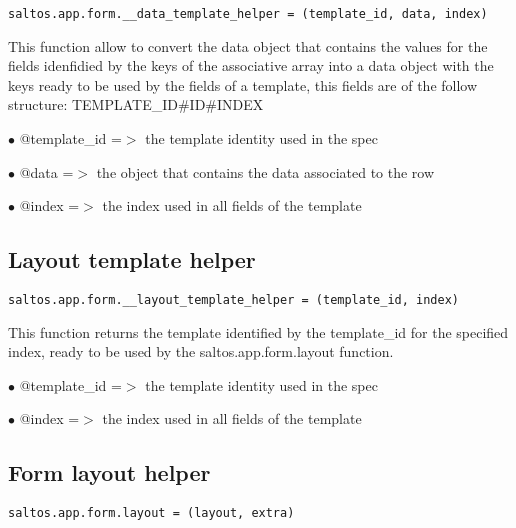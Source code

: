 \documentclass[a4paper]{book}
\begin{document}
\begin{lstlisting}
saltos.app.form.__data_template_helper = (template_id, data, index)
\end{lstlisting}

This function allow to convert the data object that contains the values for the fields idenfidied
by the keys of the associative array into a data object with the keys ready to be used by the
fields of a template, this fields are of the follow structure: TEMPLATE\_ID\#ID\#INDEX

\begin{compactitem}
\item[\color{myblue}$\bullet$] @template\_id =$>$ the template identity used in the spec
\item[\color{myblue}$\bullet$] @data        =$>$ the object that contains the data associated to the row
\item[\color{myblue}$\bullet$] @index       =$>$ the index used in all fields of the template
\end{compactitem}

\hypertarget{toc404}{}
\subsection{Layout template helper}

\begin{lstlisting}
saltos.app.form.__layout_template_helper = (template_id, index)
\end{lstlisting}

This function returns the template identified by the template\_id for the specified index, ready
to be used by the saltos.app.form.layout function.

\begin{compactitem}
\item[\color{myblue}$\bullet$] @template\_id =$>$ the template identity used in the spec
\item[\color{myblue}$\bullet$] @index       =$>$ the index used in all fields of the template
\end{compactitem}

\hypertarget{toc405}{}
\subsection{Form layout helper}

\begin{lstlisting}
saltos.app.form.layout = (layout, extra)
\end{lstlisting}
\end{document}
